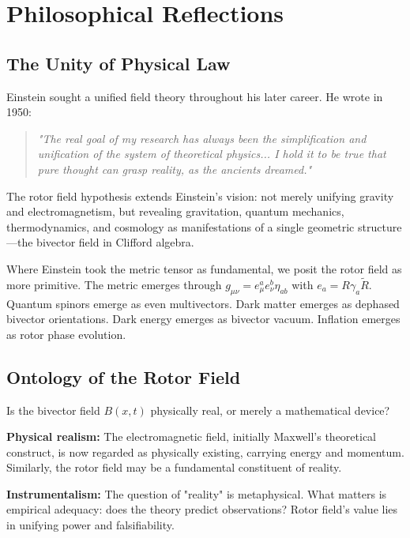 \documentclass[11pt,a4paper]{article}
\numberwithin{equation}{section}
\theoremstyle{plain}
\theoremstyle{definition}
\theoremstyle{remark}
\newcommand{\rev}[1]{\widetilde{#1}}       %
\begin{document}
\section{Philosophical Reflections}
\label{sec:philosophy}

\subsection{The Unity of Physical Law}

Einstein sought a unified field theory throughout his later career. He wrote in 1950:

\begin{quote}
\textit{"The real goal of my research has always been the simplification and unification of the system of theoretical physics... I hold it to be true that pure thought can grasp reality, as the ancients dreamed."}
\end{quote}

The rotor field hypothesis extends Einstein's vision: not merely unifying gravity and electromagnetism, but revealing gravitation, quantum mechanics, thermodynamics, and cosmology as manifestations of a single geometric structure—the bivector field in Clifford algebra.

Where Einstein took the metric tensor as fundamental, we posit the rotor field as more primitive. The metric emerges through $g_{\mu\nu} = e^a_\mu e^b_\nu \eta_{ab}$ with $e_a = R\gamma_a\rev{R}$. Quantum spinors emerge as even multivectors. Dark matter emerges as dephased bivector orientations. Dark energy emerges as bivector vacuum. Inflation emerges as rotor phase evolution.

\subsection{Ontology of the Rotor Field}

Is the bivector field $B(x,t)$ physically real, or merely a mathematical device?

\textbf{Physical realism:} The electromagnetic field, initially Maxwell's theoretical construct, is now regarded as physically existing, carrying energy and momentum. Similarly, the rotor field may be a fundamental constituent of reality.

\textbf{Instrumentalism:} The question of "reality" is metaphysical. What matters is empirical adequacy: does the theory predict observations? Rotor field's value lies in unifying power and falsifiability.
\end{document}
